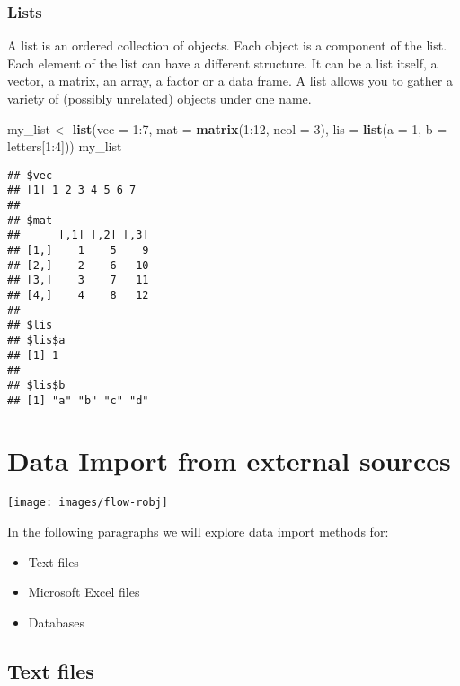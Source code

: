 \documentclass[]{book}
\newenvironment{Shaded}{\begin{snugshade}}{\end{snugshade}}
\newcommand{\KeywordTok}[1]{\textcolor[rgb]{0.13,0.29,0.53}{\textbf{{#1}}}}
\newcommand{\DataTypeTok}[1]{\textcolor[rgb]{0.13,0.29,0.53}{{#1}}}
\newcommand{\DecValTok}[1]{\textcolor[rgb]{0.00,0.00,0.81}{{#1}}}
\newcommand{\StringTok}[1]{\textcolor[rgb]{0.31,0.60,0.02}{{#1}}}
\newcommand{\NormalTok}[1]{{#1}}
\providecommand{\tightlist}{%
  \setlength{\itemsep}{0pt}\setlength{\parskip}{0pt}}
\def\tightlist{}
\begin{document}
\subsection{Lists}\label{lists}

A list is an ordered collection of objects. Each object is a component
of the list. Each element of the list can have a different structure. It
can be a list itself, a vector, a matrix, an array, a factor or a data
frame. A list allows you to gather a variety of (possibly unrelated)
objects under one name.

\begin{Shaded}
\begin{Highlighting}[]
\NormalTok{my_list <-}\StringTok{ }\KeywordTok{list}\NormalTok{(}\DataTypeTok{vec =} \DecValTok{1}\NormalTok{:}\DecValTok{7}\NormalTok{, }\DataTypeTok{mat =} \KeywordTok{matrix}\NormalTok{(}\DecValTok{1}\NormalTok{:}\DecValTok{12}\NormalTok{, }\DataTypeTok{ncol =} \DecValTok{3}\NormalTok{),}
  \DataTypeTok{lis =} \KeywordTok{list}\NormalTok{(}\DataTypeTok{a =} \DecValTok{1}\NormalTok{, }\DataTypeTok{b =} \NormalTok{letters[}\DecValTok{1}\NormalTok{:}\DecValTok{4}\NormalTok{]))}
\NormalTok{my_list}
\end{Highlighting}
\end{Shaded}

\begin{verbatim}
## $vec
## [1] 1 2 3 4 5 6 7
## 
## $mat
##      [,1] [,2] [,3]
## [1,]    1    5    9
## [2,]    2    6   10
## [3,]    3    7   11
## [4,]    4    8   12
## 
## $lis
## $lis$a
## [1] 1
## 
## $lis$b
## [1] "a" "b" "c" "d"
\end{verbatim}

\chapter{Data Import from external
sources}\label{data-import-from-external-sources}

\texttt{[image: images/flow-robj]}

In the following paragraphs we will explore data import methods for:

\begin{itemize}
\tightlist
\item
  Text files
\item
  Microsoft Excel files
\item
  Databases
\end{itemize}

\section{Text files}\label{text-files}
\end{document}
